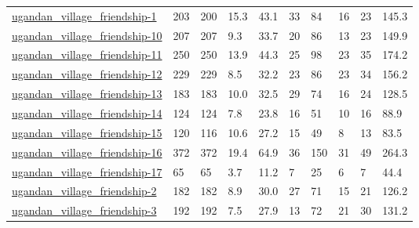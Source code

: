 \begin{longtable}{llllllllll}
 \href{https://www.repository.cam.ac.uk/handle/1810/270256?show=full}{ugandan\_village\_friendship-1}                         & 203        & 200   & 15.3   & 43.1   & 33    & 84     & 16     & 23     & 145.3   \\
 \href{https://www.repository.cam.ac.uk/handle/1810/270256?show=full}{ugandan\_village\_friendship-10}                        & 207        & 207   & 9.3    & 33.7   & 20    & 86     & 13     & 23     & 149.9   \\
 \href{https://www.repository.cam.ac.uk/handle/1810/270256?show=full}{ugandan\_village\_friendship-11}                        & 250        & 250   & 13.9   & 44.3   & 25    & 98     & 23     & 35     & 174.2   \\
 \href{https://www.repository.cam.ac.uk/handle/1810/270256?show=full}{ugandan\_village\_friendship-12}                        & 229        & 229   & 8.5    & 32.2   & 23    & 86     & 23     & 34     & 156.2   \\
 \href{https://www.repository.cam.ac.uk/handle/1810/270256?show=full}{ugandan\_village\_friendship-13}                        & 183        & 183   & 10.0   & 32.5   & 29    & 74     & 16     & 24     & 128.5   \\
 \href{https://www.repository.cam.ac.uk/handle/1810/270256?show=full}{ugandan\_village\_friendship-14}                        & 124        & 124   & 7.8    & 23.8   & 16    & 51     & 10     & 16     & 88.9    \\
 \href{https://www.repository.cam.ac.uk/handle/1810/270256?show=full}{ugandan\_village\_friendship-15}                        & 120        & 116   & 10.6   & 27.2   & 15    & 49     & 8      & 13     & 83.5    \\
 \href{https://www.repository.cam.ac.uk/handle/1810/270256?show=full}{ugandan\_village\_friendship-16}                        & 372        & 372   & 19.4   & 64.9   & 36    & 150    & 31     & 49     & 264.3   \\
 \href{https://www.repository.cam.ac.uk/handle/1810/270256?show=full}{ugandan\_village\_friendship-17}                        & 65         & 65    & 3.7    & 11.2   & 7     & 25     & 6      & 7      & 44.4    \\
 \href{https://www.repository.cam.ac.uk/handle/1810/270256?show=full}{ugandan\_village\_friendship-2}                         & 182        & 182   & 8.9    & 30.0   & 27    & 71     & 15     & 21     & 126.2   \\
 \href{https://www.repository.cam.ac.uk/handle/1810/270256?show=full}{ugandan\_village\_friendship-3}                         & 192        & 192   & 7.5    & 27.9   & 13    & 72     & 21     & 30     & 131.2   \\

\end{longtable}
